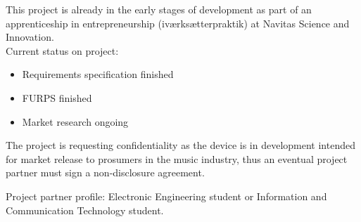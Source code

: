 This project is already in the early stages of development as part of an apprenticeship in
entrepreneurship (iværksætterpraktik) at Navitas Science and Innovation. \\
Current status on project: \\

\begin{itemize}
\item Requirements specification finished
\item FURPS finished
\item Market research ongoing
\end{itemize}

The project is requesting confidentiality as the device is in development intended for market release to
prosumers in the music industry, thus an eventual project partner must sign a non-disclosure
agreement. \newline

Project partner profile: Electronic Engineering student or Information and Communication
Technology student.